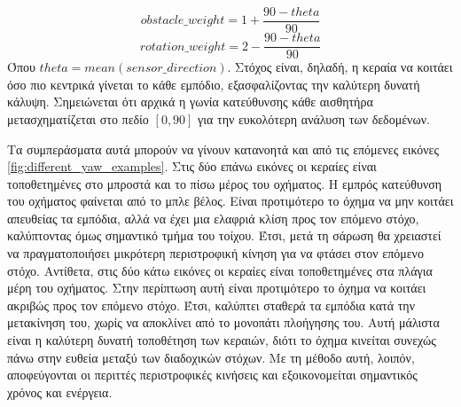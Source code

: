 \[obstacle\_weight = 1 + \frac{90 - theta}{90}\]
\[rotation\_weight = 2 - \frac{90 - theta}{90}\]
Όπου $theta = mean(sensor\_direction)$. Στόχος είναι, δηλαδή, η κεραία να κοιτάει όσο πιο κεντρικά γίνεται το κάθε εμπόδιο, εξασφαλίζοντας την καλύτερη δυνατή κάλυψη. Σημειώνεται ότι αρχικά η γωνία κατεύθυνσης κάθε αισθητήρα μετασχηματίζεται στο πεδίο $[0,90]$ για την ευκολότερη ανάλυση των δεδομένων.

Τα συμπεράσματα αυτά μπορούν να γίνουν κατανοητά και από τις επόμενες εικόνες \ref{fig:different_yaw_examples}. Στις δύο επάνω εικόνες οι κεραίες είναι τοποθετημένες στο μπροστά και το πίσω μέρος του οχήματος. Η εμπρός κατεύθυνση του οχήματος φαίνεται από το μπλε βέλος. Είναι προτιμότερο το όχημα να μην κοιτάει απευθείας τα εμπόδια, αλλά να έχει μια ελαφριά κλίση προς τον επόμενο στόχο, καλύπτοντας όμως σημαντικό τμήμα του τοίχου. Έτσι, μετά τη σάρωση θα χρειαστεί να πραγματοποιήσει μικρότερη περιστροφική κίνηση για να φτάσει στον επόμενο στόχο. Αντίθετα, στις δύο κάτω εικόνες οι κεραίες είναι τοποθετημένες στα πλάγια μέρη του οχήματος. Στην περίπτωση αυτή είναι προτιμότερο το όχημα να κοιτάει ακριβώς προς τον επόμενο στόχο. Έτσι, καλύπτει σταθερά τα εμπόδια κατά την μετακίνηση του, χωρίς να αποκλίνει από το μονοπάτι πλοήγησης του. Αυτή μάλιστα είναι η καλύτερη δυνατή τοποθέτηση των κεραιών, διότι το όχημα κινείται συνεχώς πάνω στην ευθεία μεταξύ των διαδοχικών στόχων. Με τη μέθοδο αυτή, λοιπόν, αποφεύγονται οι περιττές περιστροφικές κινήσεις και εξοικονομείται σημαντικός χρόνος και ενέργεια.


